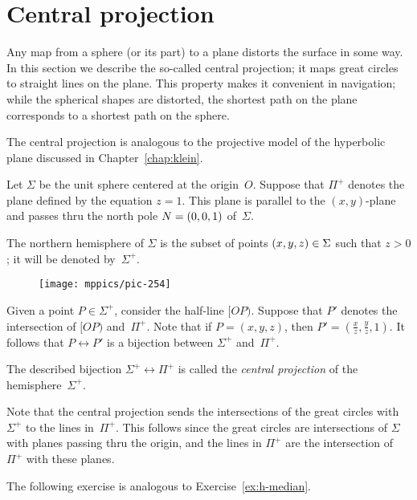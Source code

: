 \section{Central projection}

Any map from a sphere (or its part) to a plane distorts the surface in some way.
In this section we describe the so-called central projection; it maps great circles to straight lines on the plane.
This property makes it convenient in navigation;
while the spherical shapes are distorted, the shortest path on the plane corresponds to a shortest path on the sphere.

The central projection is analogous to the projective model of the hyperbolic plane discussed in Chapter~\ref{chap:klein}.

Let $\Sigma$ be the unit sphere centered at the origin~$O$.
Suppose that $\Pi^+$ denotes the plane defined by the equation $z=1$.
This plane is parallel to the $(x,y)$-plane and passes thru 
the north pole $N=(0,0,1)$ of~$\Sigma$.

The northern hemisphere of $\Sigma$
is the subset of points $(x,y,z)\in \Sigma$ such that $z>0$; it will be denoted by~$\Sigma^+$.

\begin{wrapfigure}{o}{40mm}
\centering
\vskip-3mm
\texttt{[image: mppics/pic-254]}
\end{wrapfigure}

Given a point $P\in \Sigma^+$, consider the half-line $[OP)$. 
Suppose that $P'$ denotes the intersection of $[OP)$ and~$\Pi^+$.
Note that 
if $P=(x,y,z)$, then $P'=(\tfrac xz,\tfrac yz,1)$.
It follows that $P\leftrightarrow P'$ is a bijection between $\Sigma^+$ and~$\Pi^+$.



The described bijection $\Sigma^+\leftrightarrow \Pi^+$ is called the \emph{central projection} of 
the hemisphere~$\Sigma^+$.

Note that the central projection sends the intersections of the great circles with $\Sigma^+$ to the lines in~$\Pi^+$.
This follows since the great circles are intersections of $\Sigma$ with planes passing thru the origin,
and the lines in $\Pi^+$ are the intersection of $\Pi^+$ with these planes.

The following exercise 
is analogous to Exercise~\ref{ex:h-median}.

